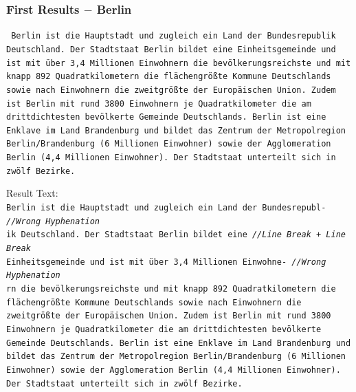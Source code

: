 \documentclass{beamer}
\begin{document}
\begin{frame}
\frametitle{First Results $-$ Berlin}

\texttt{\tiny
Berlin ist die Hauptstadt und zugleich ein Land der Bundesrepublik \\
Deutschland. Der Stadtstaat Berlin bildet eine Einheitsgemeinde und \\
ist mit über 3,4 Millionen Einwohnern die bevölkerungsreichste und mit \\
knapp 892 Quadratkilometern die flächengrößte Kommune Deutschlands \\
sowie nach Einwohnern die zweitgrößte der Europäischen Union. Zudem \\
ist Berlin mit rund 3800 Einwohnern je Quadratkilometer die am \\
drittdichtesten bevölkerte Gemeinde Deutschlands. Berlin ist eine \\
Enklave im Land Brandenburg und bildet das Zentrum der Metropolregion \\
Berlin/Brandenburg (6 Millionen Einwohner) sowie der Agglomeration \\
Berlin (4,4 Millionen Einwohner). Der Stadtstaat unterteilt sich in \\
zwölf Bezirke. \\
}

Result Text: \\

\texttt{\scriptsize{B}\tiny erlin ist die Hauptstadt und zugleich ein Land der Bundesrepubl- \hskip 15pt \emph{//Wrong Hyphenation} \\
\scriptsize{i}\tiny k Deutschland. Der Stadtstaat Berlin bildet eine \hskip 62pt \emph{//Line Break + Line Break} \\
\scriptsize{E}\tiny inheitsgemeinde und ist mit über 3,4 Millionen Einwohne- \hskip 40pt \emph{//Wrong Hyphenation} \\
\scriptsize{r}\tiny n die bevölkerungsreichste und mit knapp 892 Quadratkilometern die \\
flächengrößte Kommune Deutschlands sowie nach Einwohnern die \\
zweitgrößte der Europäischen Union. Zudem ist Berlin mit rund 3800 \\
Einwohnern je Quadratkilometer die am drittdichtesten bevölkerte \\
Gemeinde Deutschlands. Berlin ist eine Enklave im Land Brandenburg und \\
bildet das Zentrum der Metropolregion Berlin/Brandenburg (6 Millionen \\
Einwohner) sowie der Agglomeration Berlin (4,4 Millionen Einwohner). \\
Der Stadtstaat unterteilt sich in zwölf Bezirke. \\
}
\end{frame}
\end{document}
